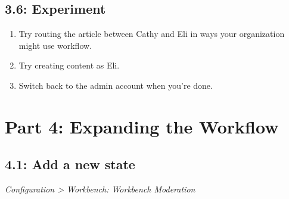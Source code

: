 \documentclass[letterpaper,10pt,english]{sphinxmanual}
\begin{document}
\subsection{3.6: Experiment}
\label{workbench:experiment}\begin{enumerate}
\item {} 
Try routing the article between Cathy and Eli in ways your organization might use workflow.

\item {} 
Try creating content as Eli.

\item {} 
Switch back to the admin account when you're done.

\end{enumerate}


\section{Part 4: Expanding the Workflow}
\label{workbench:part-4-expanding-the-workflow}

\subsection{4.1: Add a new state}
\label{workbench:add-a-new-state}
\emph{Configuration \textgreater{} Workbench: Workbench Moderation}
\end{document}
